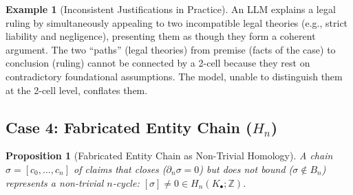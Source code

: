 \documentclass[11pt,a4paper]{article}
\theoremstyle{plain}
\newtheorem{proposition}[theorem]{Proposition}
\theoremstyle{definition}
\newtheorem{example}[theorem]{Example}
\theoremstyle{remark}
\newcommand{\Z}{\mathbb{Z}}
\begin{document}
\begin{example}[Inconsistent Justifications in Practice]
\label{ex:inconsistent}
An LLM explains a legal ruling by simultaneously appealing to two incompatible legal theories (e.g., strict liability and negligence), presenting them as though they form a coherent argument. The two ``paths'' (legal theories) from premise (facts of the case) to conclusion (ruling) cannot be connected by a 2-cell because they rest on contradictory foundational assumptions. The model, unable to distinguish them at the 2-cell level, conflates them.
\end{example}

\subsection{Case 4: Fabricated Entity Chain ($H_n$)}
\label{sec:case4}

\begin{proposition}[Fabricated Entity Chain as Non-Trivial Homology]
\label{prop:case4}
A chain $\sigma = [c_0, \ldots, c_n]$ of claims that closes ($\partial_n \sigma = 0$) but does not bound ($\sigma \notin B_n$) represents a non-trivial $n$-cycle: $[\sigma] \neq 0 \in H_n(K_\bullet; \Z)$.
\end{proposition}
\end{document}
